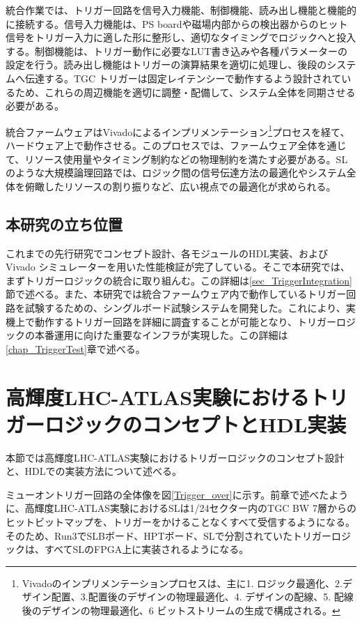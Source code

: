 統合作業では、トリガー回路を信号入力機能、制御機能、読み出し機能と機能的に接続する。信号入力機能は、PS boardや磁場内部からの検出器からのヒット信号をトリガー入力に適した形に整形し、適切なタイミングでロジックへと投入する。制御機能は、トリガー動作に必要なLUT書き込みや各種パラメーターの設定を行う。読み出し機能はトリガーの演算結果を適切に処理し、後段のシステムへ伝達する。TGC トリガーは固定レイテンシーで動作するよう設計されているため、これらの周辺機能を適切に調整・配備して、システム全体を同期させる必要がある。

統合ファームウェアはVivadoによるインプリメンテーション\footnote{Vivadoのインプリメンテーションプロセスは、主に1. ロジック最適化、2.デザイン配置、3.配置後のデザインの物理最適化、4. デザインの配線、5. 配線後のデザインの物理最適化、6 ビットストリームの生成で構成される。}プロセスを経て、ハードウェア上で動作させる。このプロセスでは、ファームウェア全体を通じて、リソース使用量やタイミング制約などの物理制約を満たす必要がある。SLのような大規模論理回路では、ロジック間の信号伝達方法の最適化やシステム全体を俯瞰したリソースの割り振りなど、広い視点での最適化が求められる。

\subsection*{本研究の立ち位置}
これまでの先行研究でコンセプト設計、各モジュールのHDL実装、およびVivado シミュレーターを用いた性能検証が完了している。そこで本研究では、まずトリガーロジックの統合に取り組んむ。この詳細は\ref{sec_TriggerIntegration}節で述べる。また、本研究では統合ファームウェア内で動作しているトリガー回路を試験するための、シングルボード試験システムを開発した。これにより、実機上で動作するトリガー回路を詳細に調査することが可能となり、トリガーロジックの本番運用に向けた重要なインフラが実現した。この詳細は\ref{chap_TriggerTest}章で述べる。

\section{高輝度LHC-ATLAS実験におけるトリガーロジックのコンセプトとHDL実装}
\label{sec_Phase2TriggerLogic}
本節では高輝度LHC-ATLAS実験におけるトリガーロジックのコンセプト設計と、HDLでの実装方法について述べる。

ミューオントリガー回路の全体像を図\ref{Trigger_over}に示す。前章で述べたように、高輝度LHC-ATLAS実験におけるSLは1/24セクター内のTGC BW 7層からのヒットビットマップを、トリガーをかけることなくすべて受信するようになる。そのため、Run3でSLBボード、HPTボード、SLで分割されていたトリガーロジックは、すべてSLのFPGA上に実装されるようになる。

